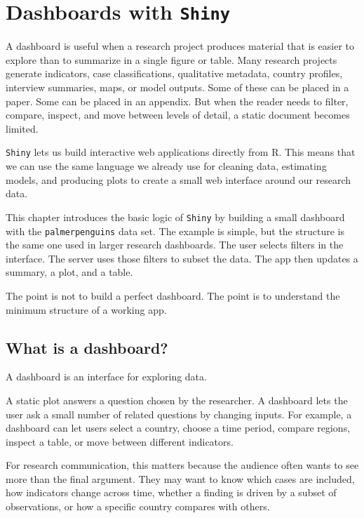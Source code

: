\documentclass[
  letterpaper,
  DIV=11,
  numbers=noendperiod]{scrreprt}
\begin{document}

\chapter{\texorpdfstring{Dashboards with
\texttt{Shiny}}{Dashboards with Shiny}}\label{dashboards}

A dashboard is useful when a research project produces material that is
easier to explore than to summarize in a single figure or table. Many
research projects generate indicators, case classifications, qualitative
metadata, country profiles, interview summaries, maps, or model outputs.
Some of these can be placed in a paper. Some can be placed in an
appendix. But when the reader needs to filter, compare, inspect, and
move between levels of detail, a static document becomes limited.

\texttt{Shiny} lets us build interactive web applications directly from
R. This means that we can use the same language we already use for
cleaning data, estimating models, and producing plots to create a small
web interface around our research data.

This chapter introduces the basic logic of \texttt{Shiny} by building a
small dashboard with the \texttt{palmerpenguins} data set. The example
is simple, but the structure is the same one used in larger research
dashboards. The user selects filters in the interface. The server uses
those filters to subset the data. The app then updates a summary, a
plot, and a table.

The point is not to build a perfect dashboard. The point is to
understand the minimum structure of a working app.

\section{What is a dashboard?}\label{what-is-a-dashboard}

A dashboard is an interface for exploring data.

A static plot answers a question chosen by the researcher. A dashboard
lets the user ask a small number of related questions by changing
inputs. For example, a dashboard can let users select a country, choose
a time period, compare regions, inspect a table, or move between
different indicators.

For research communication, this matters because the audience often
wants to see more than the final argument. They may want to know which
cases are included, how indicators change across time, whether a finding
is driven by a subset of observations, or how a specific country
compares with others.
\end{document}
